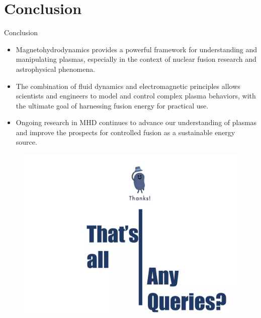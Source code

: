 \documentclass[13pt]{beamer}
\begin{document}
\section{Conclusion}
\begin{frame}[t]{Conclusion}

\begin{itemize}
	\item Magnetohydrodynamics provides a powerful framework for understanding and manipulating plasmas, especially in the context of nuclear fusion research and astrophysical phenomena.
	\item 	The combination of fluid dynamics and electromagnetic principles allows scientists and engineers to model and control complex plasma behaviors, with the ultimate goal of harnessing fusion energy for practical use.
	\item 	Ongoing research in MHD continues to advance our understanding of plasmas and improve the prospects for controlled fusion as a sustainable energy source.

\end{itemize}



\end{frame}

\begin{frame}

	\begin{figure}

		\includegraphics[width = \textwidth]{Images/thanks.png}
	\end{figure}


\end{frame}
\end{document}
